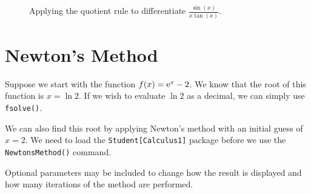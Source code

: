 \clearpage

\begin{figure}[h]
\caption{Applying the quotient rule to differentiate $\frac{\sin(x)}{x\tan(x)}$.}
\centering
{}
\end{figure}

\section{Newton's Method} \label{sec:newtonsmethod}

Suppose we start with the function $f(x) = {\rm e}^x - 2$. We know that the root of this function is $x = \ln 2$. If we wish to evaluate $\ln 2$ as a decimal, we can simply use \texttt{fsolve()}.



\begin{maplegroup}
\begin{mapleinput}
\end{mapleinput}
\mapleresult
\begin{maplelatex}
\end{maplelatex}
\end{maplegroup}

\begin{maplegroup}
\begin{mapleinput}
\end{mapleinput}
\mapleresult
\begin{maplelatex}
\end{maplelatex}
\end{maplegroup}

We can also find this root by applying Newton's method with an initial guess of $x=2$. We need to load the \texttt{Student[Calculus1]} package before we use the \texttt{NewtonsMethod()} command. 

Optional parameters may be included to change how the result is displayed and how many iterations of the method are performed.

